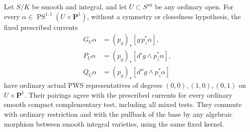\begin{theorem}
\label{r15hp:green-outputs}
Let $S/K$ be smooth and integral, and let $U\subset S^{\mathrm{an}}$
be any ordinary open.  For every
$\alpha\in\operatorname{PS}^{1,1}(U\times\mathbf P^1)$,
without a symmetry or closedness hypothesis, the fixed prescribed
currents
\[
 \begin{split}
 G_U\alpha&=(p_y)_*[g\,p_z^*\alpha],\\
 P_U\alpha&=(p_y)_*[d'g\wedge p_z^*\alpha],\\
 Q_U\alpha&=(p_y)_*[d''g\wedge p_z^*\alpha]
 \end{split}
\tag{HP15.17}\label{r15hp:three-currents}
\]
have ordinary actual PWS representatives of degrees
$(0,0),(1,0),(0,1)$ on $U\times\mathbf P^1$.
Their pairings agree with the prescribed currents for every
ordinary smooth compact complementary test, including all mixed
tests.  They commute with ordinary restriction and with the
pullback of the base by any algebraic morphism between smooth
integral varieties, using the same fixed kernel.
\end{theorem}

